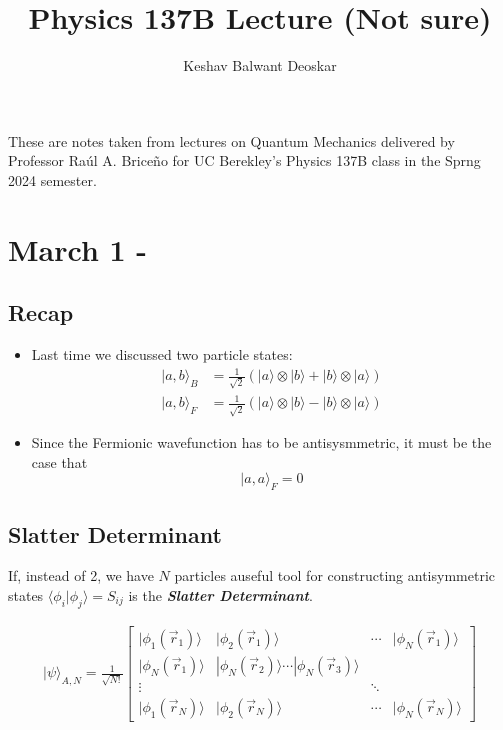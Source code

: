 \documentclass{article}
\title{Physics 137B Lecture (Not sure)}
\author{Keshav Balwant Deoskar}
\newcommand{\ket}[1]{|#1 \rangle}
\newcommand{\inner}[2]{\langle #1 | #2 \rangle}
\begin{document}
\maketitle

These are notes taken from lectures on Quantum Mechanics delivered by Professor Raúl A. Briceño for UC Berekley's Physics 137B class in the Sprng 2024 semester.

\tableofcontents

\pagebreak

\section{March 1 - }

\vskip 1cm

\subsection*{Recap}
\begin{itemize}
  \item Last time we discussed two particle states:
  \begin{align*}
    \ket{a, b}_{B} &= \frac{1}{\sqrt{2}} \left( \ket{a} \otimes \ket{b}+ \ket{b} \otimes \ket{a} \right) \\
    \ket{a, b}_{F} &= \frac{1}{\sqrt{2}} \left( \ket{a} \otimes \ket{b} - \ket{b} \otimes \ket{a} \right)
  \end{align*}
  \item Since the Fermionic wavefunction has to be antisysmmetric, it must be the case that 
  \[  \ket{a,a}_{F} = 0 \]
\end{itemize}

\vskip 0.5cm
\subsection{Slatter Determinant}
\vskip 0.5cm
If, instead of 2, we have $N$ particles auseful tool for constructing antisymmetric states $\inner{\phi_i}{\phi_j} = S_{ij}$ is the \emph{\textbf{Slatter Determinant}}.

\vskip 0.5cm
\begin{align*}
  \ket{\psi}_{A, N} = \frac{1}{\sqrt{N!}} \begin{bmatrix}
    \ket{\phi_1(\vec{r}_1)} & \ket{\phi_2(\vec{r}_1)} & \cdots & \ket{\phi_N(\vec{r}_1)} \\
    \ket{\phi_N(\vec{r}_1)} & \ket{\phi_N(\vec{r}_2)} \cdots \ket{\phi_N(\vec{r}_3)} \\
    \vdots&  & \ddots \\
    \ket{\phi_1(\vec{r}_N)} & \ket{\phi_2(\vec{r}_N)} & \cdots & \ket{\phi_N(\vec{r}_N)}
  \end{bmatrix}
\end{align*}
\end{document}
